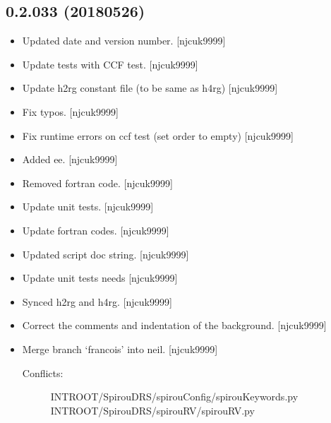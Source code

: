 \documentclass[a4paper,10pt,english]{report}
\begin{document}
\subsection{0.2.033 (2018\sphinxhyphen{}05\sphinxhyphen{}26)}
\label{\detokenize{misc/changelog:id448}}\begin{itemize}
\item {} 
Updated date and version number. {[}njcuk9999{]}

\item {} 
Update tests with CCF test. {[}njcuk9999{]}

\item {} 
Update h2rg constant file (to be same as h4rg) {[}njcuk9999{]}

\item {} 
Fix typos. {[}njcuk9999{]}

\item {} 
Fix runtime errors on ccf test (set order to empty) {[}njcuk9999{]}

\item {} 
Added ee. {[}njcuk9999{]}

\item {} 
Removed fortran code. {[}njcuk9999{]}

\item {} 
Update unit tests. {[}njcuk9999{]}

\item {} 
Update fortran codes. {[}njcuk9999{]}

\item {} 
Updated script doc string. {[}njcuk9999{]}

\item {} 
Update unit tests  needs  {[}njcuk9999{]}

\item {} 
Synced h2rg and h4rg. {[}njcuk9999{]}

\item {} 
Correct the comments and indentation of the background. {[}njcuk9999{]}

\item {} 
Merge branch ‘francois’ into neil. {[}njcuk9999{]}
\begin{description}
\item[{Conflicts:}] \leavevmode
INTROOT/SpirouDRS/spirouConfig/spirouKeywords.py
INTROOT/SpirouDRS/spirouRV/spirouRV.py


\end{description}
\end{itemize}
\end{document}
